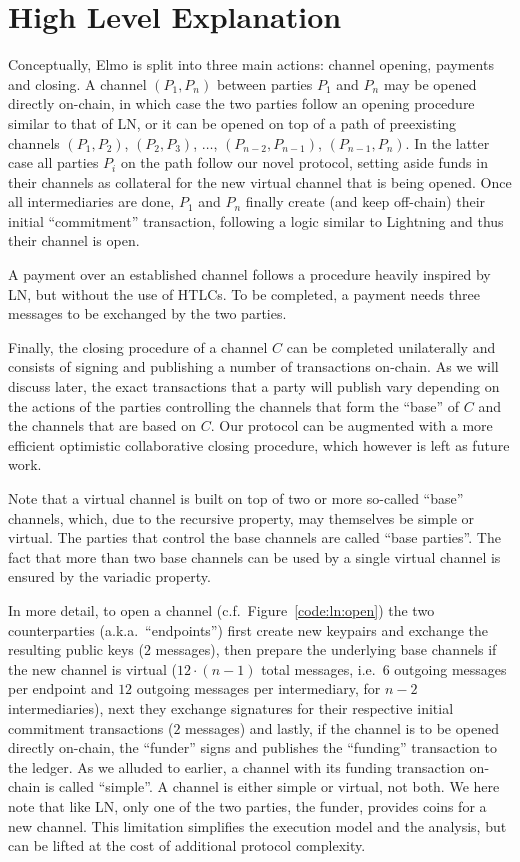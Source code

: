 \section{High Level Explanation}
  Conceptually, Elmo is split into three main actions: channel opening,
  payments and closing. A channel $(P_1, P_n)$ between parties $P_1$ and $P_n$
  may be opened directly on-chain, in which case the two parties follow an
  opening procedure similar to that of LN, or it can be opened on top of a path
  of preexisting channels $(P_1, P_2)$, $(P_2, P_3)$, $\dots$, $(P_{n-2},
  P_{n-1})$, $(P_{n-1}, P_{n})$. In the latter case all parties $P_i$ on the
  path follow our novel protocol, setting aside funds in their channels as
  collateral for the new virtual channel that is being opened. Once all
  intermediaries are done, $P_1$ and $P_n$ finally create (and keep
  off-chain) their initial ``commitment'' transaction, following a logic similar to
  Lightning and thus their channel is open.

  A payment over an established channel follows a procedure heavily inspired by
  LN, but without the use of HTLCs. To be completed, a payment needs three
  messages to be exchanged by the two parties.

  Finally, the closing procedure of a channel $C$ can be completed unilaterally
  and consists of signing and publishing a number of transactions on-chain. As
  we will discuss later, the exact transactions that a party will publish vary
  depending on the actions of the parties controlling the channels that form the
  ``base'' of $C$ and the channels that are based on $C$. Our protocol can be
  augmented with a more efficient optimistic collaborative closing procedure,
  which however is left as future work.

  Note that a virtual channel is built on top of two or more so-called ``base''
  channels, which, due to the recursive property, may themselves be simple or
  virtual. The parties that control the base channels are called ``base
  parties''. The fact that more than two base channels can be used by a single
  virtual channel is ensured by the variadic property.

  In more detail, to open a channel (c.f.\ Figure~\ref{code:ln:open}) the two
  counterparties (a.k.a.\ ``endpoints'') first create new keypairs and exchange
  the resulting public keys ($2$ messages), then prepare the underlying base
  channels if the new channel is virtual ($12 \cdot (n-1)$ total messages, i.e.\
  $6$ outgoing messages per endpoint and $12$ outgoing messages per
  intermediary, for $n-2$ intermediaries), next they exchange signatures for
  their respective initial commitment transactions ($2$ messages) and lastly, if
  the channel is to be opened directly on-chain, the ``funder'' signs and publishes
  the ``funding'' transaction to the ledger. As we alluded to earlier, a channel
  with its funding transaction on-chain is called ``simple''. A channel is
  either simple or virtual, not both. We here note that like LN, only one of the
  two parties, the funder, provides coins for a new channel. This limitation
  simplifies the execution model and the analysis, but can be lifted at the cost
  of additional protocol complexity.

